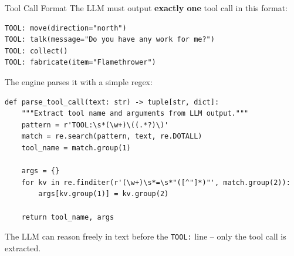 \documentclass[aspectratio=169,10pt]{beamer}
\newcommand{\mutedtext}[1]{\textcolor{textmuted}{#1}}
\begin{document}
\begin{frame}[fragile]{Tool Call Format}
The LLM must output \textbf{exactly one} tool call in this format:
\begin{lstlisting}[style=textcode]
TOOL: move(direction="north")
TOOL: talk(message="Do you have any work for me?")
TOOL: collect()
TOOL: fabricate(item="Flamethrower")
\end{lstlisting}
\vspace{0.3em}
The engine parses it with a simple regex:
\begin{lstlisting}[style=pycode]
def parse_tool_call(text: str) -> tuple[str, dict]:
    """Extract tool name and arguments from LLM output."""
    pattern = r'TOOL:\s*(\w+)\((.*?)\)'
    match = re.search(pattern, text, re.DOTALL)
    tool_name = match.group(1)

    args = {}
    for kv in re.finditer(r'(\w+)\s*=\s*"([^"]*)"', match.group(2)):
        args[kv.group(1)] = kv.group(2)

    return tool_name, args
\end{lstlisting}
\mutedtext{\scriptsize The LLM can reason freely in text before the \texttt{TOOL:} line -- only the tool call is extracted.}
\end{frame}
\end{document}

